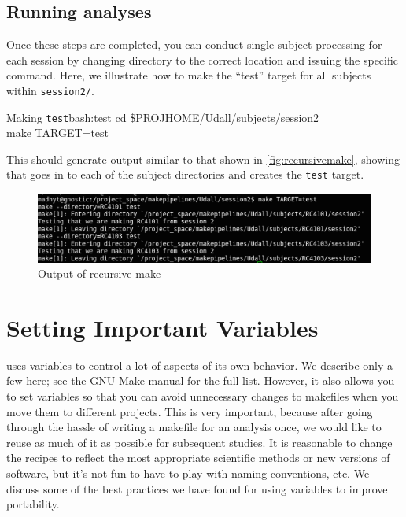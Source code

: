 \subsection{Running analyses}
Once these steps are completed, you can conduct single-subject processing for each session by changing directory to the correct location and issuing the specific \maken{} command. Here, we illustrate how to make the ``test'' target for all subjects within \texttt{session2/}.

\begin{bash}{Making \texttt{test}}{bash:test}
	cd \$PROJHOME/Udall/subjects/session2 \\
	make TARGET=test
\end{bash}

This should generate output similar to that shown in \autoref{fig:recursivemake}, showing that \maken{} goes in to each of the subject directories and creates the \texttt{test} target.

\begin{figure}[h]
	\includegraphics[width=\textwidth]{images/make-output.eps}
	\caption{Output of recursive make}
	\label{fig:recursivemake}
\end{figure}

\section{Setting Important Variables}

\maken{} uses variables to control a lot of aspects of its own behavior. We describe only a few here; see the \href{http://www.gnu.org/software/make/manual/}{GNU Make manual} for the full list. However, it also allows you to set variables so that you can avoid unnecessary changes to makefiles when you move them to different projects. This is very important, because after going through the hassle of writing a makefile for an analysis once, we would like to reuse as much of it as possible for subsequent studies. It is reasonable to change the recipes to reflect the most appropriate scientific methods or new versions of software, but it's not fun to have to play with naming conventions, etc. We discuss some of the best practices we have found for using variables to improve portability.

